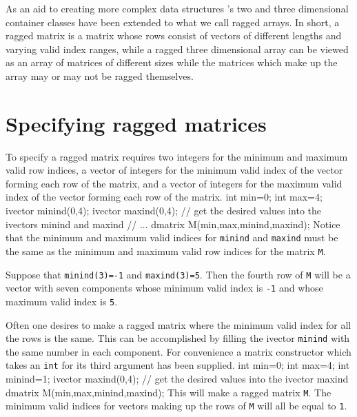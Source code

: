 \documentclass[12pt]{book}
\begin{document}
As an aid to creating more complex data structures \AD's
two and three dimensional
container classes have been extended to what we call
ragged arrays.  In short, a ragged matrix is a matrix whose
rows consist of vectors of different lengths and varying
valid index ranges, while a ragged three dimensional array
can be viewed as an array of matrices of different sizes
while the matrices which make up the array may or may not be
ragged themselves.

\section{Specifying ragged matrices}

To specify a ragged matrix requires two integers for the minimum
and maximum valid row indices, a vector of integers for the minimum
valid index of the vector forming each row of the matrix,
and a vector of integers for the maximum
valid index of the vector forming each row of the matrix. 
\beginexample
int min=0;
int max=4;
ivector minind(0,4);
ivector maxind(0,4);  
// get the desired values into the ivectors minind and maxind
// ...
dmatrix M(min,max,minind,maxind);
\endexample
Notice that the minimum and maximum valid indices for {\tt minind}
and {\tt maxind} must be the same as the minimum and maximum
valid row indices for the matrix {\tt M}.

Suppose that {\tt minind(3)=-1} and {\tt maxind(3)=5}. Then the 
fourth row of {\tt M} will be a vector with seven components
whose minimum valid index is {\tt -1} and whose maximum valid index
is {\tt 5}.

Often one desires to make a ragged matrix where the minimum valid index
for all the rows is the same. This can be accomplished by filling
the ivector {\tt minind} with the same number in each component.
For convenience a matrix constructor which takes an {\tt int}
for its third argument has been supplied. 
\beginexample
int min=0;
int max=4;
int minind=1;
ivector maxind(0,4);  
// get the desired values into the ivector maxind
dmatrix M(min,max,minind,maxind);
\endexample
\noindent This will make a ragged matrix {\tt M}. The minimum
valid indices  for vectors making up the rows of {\tt M}
will all be equal to {\tt 1}.
\end{document}
